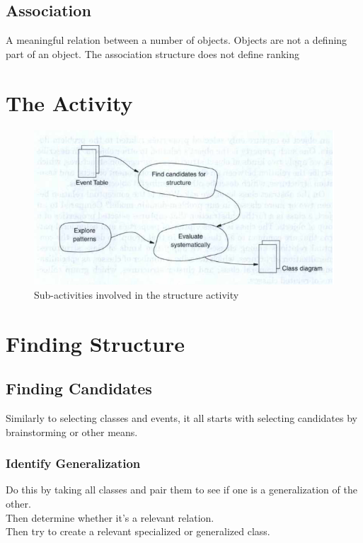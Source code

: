 \subsection*{Association}
A meaningful relation between a number of objects. Objects are not a defining part of an object. The association structure does not define ranking

\section{The Activity}
\begin{figure}[H]
    \center
    \includegraphics[width=\linewidth*3/4]{chapters/structure/figures/structure_activity.png}
    \caption{Sub-activities involved in the structure activity \ooad[74]}
    \label{fig:structure_structure_activity}
\end{figure}

\section{Finding Structure \ooad[79]}
\subsection*{Finding Candidates}
Similarly to selecting classes and events, it all starts with selecting candidates by brainstorming or other means.

\subsubsection*{Identify Generalization \ooad[80]}
Do this by taking all classes and pair them to see if one is a generalization of the other. \\
Then determine whether it's a relevant relation.\\
Then try to create a relevant specialized or generalized class.

